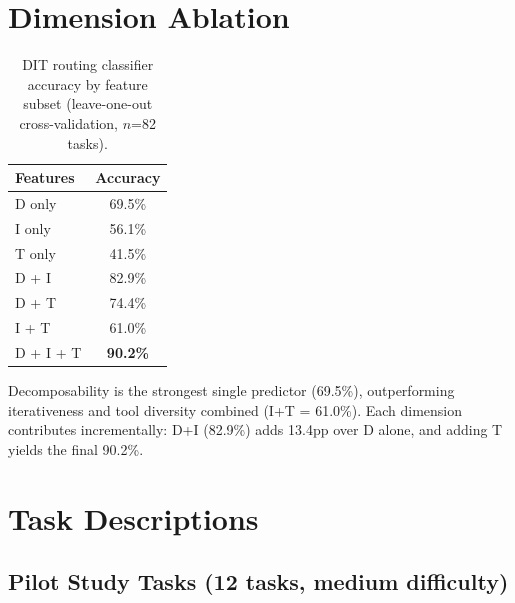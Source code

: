 \section{Dimension Ablation}
\label{sec:ablation_detail}

\begin{table}[h]
\centering
\caption{DIT routing classifier accuracy by feature subset (leave-one-out cross-validation, $n$=82 tasks).}
\label{tab:ablation}
\begin{tabular}{lc}
\toprule
\textbf{Features} & \textbf{Accuracy} \\
\midrule
D only   & 69.5\% \\
I only   & 56.1\% \\
T only   & 41.5\% \\
D + I    & 82.9\% \\
D + T    & 74.4\% \\
I + T    & 61.0\% \\
D + I + T & \textbf{90.2\%} \\
\bottomrule
\end{tabular}
\end{table}

Decomposability is the strongest single predictor (69.5\%), outperforming iterativeness and tool diversity combined (I+T = 61.0\%). Each dimension contributes incrementally: D+I (82.9\%) adds 13.4pp over D alone, and adding T yields the final 90.2\%.

\section{Task Descriptions}
\label{app:tasks}

\subsection{Pilot Study Tasks (12 tasks, medium difficulty)}

